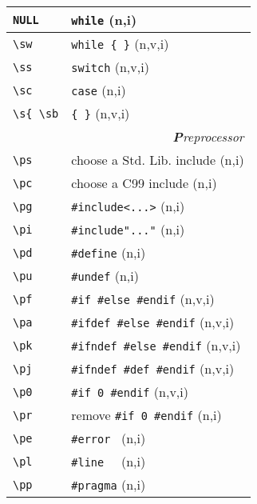 \documentclass[oneside,11pt,landscape,DIV16]{scrartcl}
\begin{document}
\begin{multicols}{3}
\begin{center}
\begin{tabular}[]{|p{15mm}|p{55mm}|}
\hline \verb'NULL'  & \verb'while'               \hfill (n,i)\\
\hline \verb'\sw' & \verb'while { }'           \hfill (n,v,i)\\
\hline \verb'\ss'  & \verb'switch'              \hfill (n,v,i)\\
\hline \verb'\sc'  & \verb'case'                \hfill (n,i)\\
\hline \verb'\s{ \sb'  & \verb'{ }'             \hfill (n,v,i)\\
\hline
\hline
\multicolumn{2}{|r|}{\textsl{\textbf{P}reprocessor}}   \\
\hline \verb'\ps'   & choose a Std. Lib. include    \hfill (n,i)\\
\hline \verb'\pc'   & choose a C99 include         \hfill (n,i)\\
\hline \verb'\pg'   & \verb$#include<...>$         \hfill (n,i)\\
\hline \verb'\pi'   & \verb$#include"..."$         \hfill (n,i)\\
\hline \verb'\pd'   & \verb'#define'               \hfill (n,i)\\
\hline \verb'\pu'   & \verb'#undef'                \hfill (n,i)\\
\hline \verb'\pf'  & \verb'#if #else #endif'      \hfill (n,v,i)\\
\hline \verb'\pa'  & \verb'#ifdef #else #endif'   \hfill (n,v,i)\\
\hline \verb'\pk'  & \verb'#ifndef #else #endif'  \hfill (n,v,i)\\
\hline \verb'\pj' & \verb'#ifndef #def #endif'   \hfill (n,v,i)\\
\hline \verb'\p0'  & \verb'#if 0 #endif'          \hfill (n,v,i)\\
\hline \verb'\pr'  & remove \verb'#if 0 #endif'   \hfill (n,i)\\
\hline \verb'\pe'   & \verb'#error '               \hfill (n,i)\\
\hline \verb'\pl'   & \verb'#line  '               \hfill (n,i)\\
\hline \verb'\pp'   & \verb'#pragma'               \hfill (n,i)\\
\hline
\end{tabular} \\


\end{center}
\end{multicols}
\end{document}
